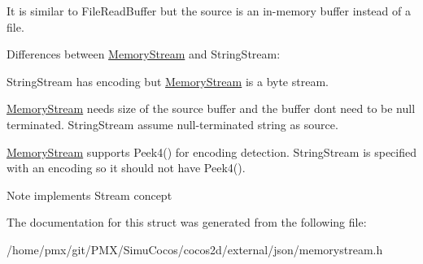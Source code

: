 It is similar to File\+Read\+Buffer but the source is an in-\/memory buffer instead of a file.

Differences between \hyperlink{structMemoryStream}{Memory\+Stream} and String\+Stream\+:
\begin{DoxyEnumerate}
\item String\+Stream has encoding but \hyperlink{structMemoryStream}{Memory\+Stream} is a byte stream.
\item \hyperlink{structMemoryStream}{Memory\+Stream} needs size of the source buffer and the buffer don\textquotesingle{}t need to be null terminated. String\+Stream assume null-\/terminated string as source.
\item \hyperlink{structMemoryStream}{Memory\+Stream} supports Peek4() for encoding detection. String\+Stream is specified with an encoding so it should not have Peek4(). \begin{DoxyNote}{Note}
implements Stream concept 
\end{DoxyNote}

\end{DoxyEnumerate}

The documentation for this struct was generated from the following file\+:\begin{DoxyCompactItemize}
\item 
/home/pmx/git/\+P\+M\+X/\+Simu\+Cocos/cocos2d/external/json/memorystream.\+h\end{DoxyCompactItemize}
